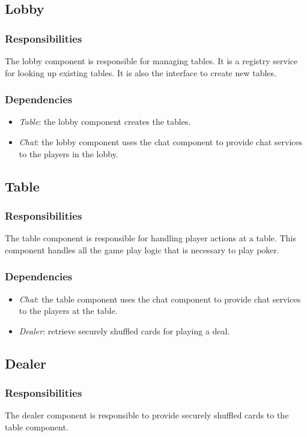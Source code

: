 \documentclass[a4paper,11pt]{report}
\begin{document}
\subsection{Lobby}
\subsubsection{Responsibilities}
The lobby component is responsible for managing tables. It is a registry service for looking up existing tables. It is also the interface to create new tables. 
\subsubsection{Dependencies}
\begin{itemize}
\item \emph{Table}: the lobby component creates the tables.
\item \emph{Chat}: the lobby component uses the chat component to provide chat services to the players in the lobby.
\end{itemize}

\subsection{Table}
\subsubsection{Responsibilities}
The table component is responsible for handling player actions at a table. This component handles all the game play logic that is necessary to play poker.
\subsubsection{Dependencies}
\begin{itemize}
\item \emph{Chat}: the table component uses the chat component to provide chat services to the players at the table.
\item \emph{Dealer}: retrieve securely shuffled cards for playing a deal.
\end{itemize}

\subsection{Dealer}
\subsubsection{Responsibilities}
The dealer component is responsible to provide securely shuffled cards to the table component.
\end{document}

